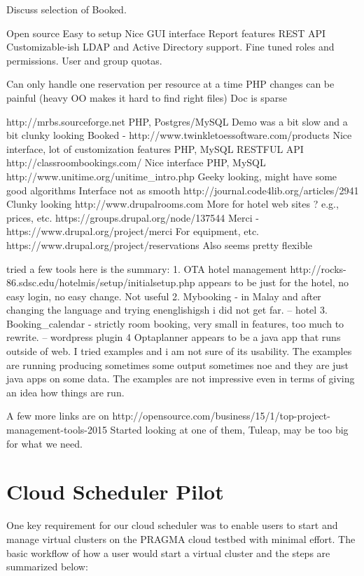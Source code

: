 \documentclass{acm_proc_article-sp}
\begin{document}
Discuss selection of Booked.

Open source
Easy to setup
Nice GUI interface
Report features
REST API
Customizable-ish
LDAP and Active Directory support.
Fine tuned roles and permissions.
User and group quotas.

Can only handle one reservation per resource at a time
PHP changes can be painful (heavy OO makes it hard to find right files)
Doc is sparse

http://mrbs.sourceforge.net
	PHP, Postgres/MySQL
	Demo was a bit slow and a bit clunky looking
Booked - http://www.twinkletoessoftware.com/products
	Nice interface, lot of customization features
	PHP, MySQL
	RESTFUL API
http://classroombookings.com/
	Nice interface
	PHP, MySQL
http://www.unitime.org/unitime\_intro.php
	Geeky looking, might have some good algorithms
	Interface not as smooth
	http://journal.code4lib.org/articles/2941
	Clunky looking
http://www.drupalrooms.com
	More for hotel web sites ? e.g., prices, etc.
https://groups.drupal.org/node/137544
	Merci - https://www.drupal.org/project/merci
		For equipment, etc.
	https://www.drupal.org/project/reservations
		Also seems pretty flexible
		
		
 tried a few tools  here is the summary:
1. OTA hotel management   http://rocks-86.sdsc.edu/hotelmis/setup/initialsetup.php
    appears to be just for the hotel, no easy login, no easy change. Not useful
2. Mybooking - in Malay and after changing the language and trying enenglishigsh i did not get far. -- hotel
3. Booking\_calendar - strictly room booking, very small in features, too much to rewrite. -- wordpress plugin
4 Optaplanner appears to be a java app that runs outside of web. I tried examples and i am
   not sure of its usability. The examples are running producing sometimes some output sometimes noe
   and they are just java apps on some data. The examples  are not impressive even in terms of giving
   an idea how things are run. 

A few more links are on http://opensource.com/business/15/1/top-project-management-tools-2015
Started looking at  one of them, Tuleap, may be too big for what we need. 


\section{Cloud Scheduler Pilot}
\label{Sec:Pilot}

One key requirement for our cloud scheduler was to enable users to start and manage virtual clusters on the PRAGMA cloud testbed with minimal effort. 
The basic workflow of how a user would start a virtual cluster and the steps are summarized below:
\end{document}
